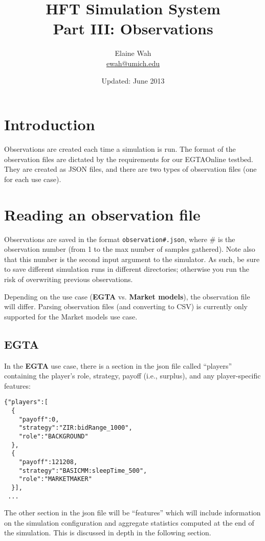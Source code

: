 \documentclass[11pt]{article}
\title{HFT Simulation System \\
Part III: Observations}
\author{
  Elaine Wah\\
  \href{mailto:ewah@umich.edu}{ewah@umich.edu}
}
\date{Updated: June 2013}
\begin{document}
	
\maketitle

\section{Introduction}

Observations are created each time a simulation is run.
The format of the observation files are dictated by the requirements for our EGTAOnline testbed. They are created as JSON files, and there are two types of observation files (one for each use case).

\section{Reading an observation file}

Observations are saved in the format \verb|observation#.json|, where \# is the observation number (from 1 to the max number of samples gathered). Note also that this number is the second input argument to the simulator.
As such, be sure to save different simulation runs in different directories; otherwise you run the risk of overwriting previous observations.

Depending on the use case (\textbf{EGTA} vs. \textbf{Market models}), the observation file will differ. Parsing observation files (and converting to CSV) is currently only supported for the Market models use case.

\subsection{EGTA}

In the \textbf{EGTA} use case, there is a section in the json file called ``players'' containing the player's role, strategy, payoff (i.e., surplus), and any player-specific features:

\begin{verbatim}
{"players":[
  {
    "payoff":0,
    "strategy":"ZIR:bidRange_1000",
    "role":"BACKGROUND"
  },
  {
    "payoff":121208,
    "strategy":"BASICMM:sleepTime_500",
    "role":"MARKETMAKER"
  }],
 ...
\end{verbatim}

The other section in the json file will be ``features'' which will include information on the simulation configuration and aggregate statistics computed at the end of the simulation. This is discussed in depth in the following section.
\end{document}
